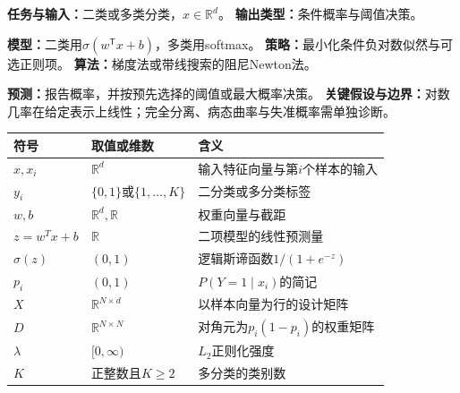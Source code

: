 \begin{keypointbox}[title=模型认识卡：逻辑斯谛回归]
\textbf{任务与输入：}二类或多类分类，$x\in\mathbb R^d$。\quad
\textbf{输出类型：}条件概率与阈值决策。\par
\textbf{模型：}二类用$\sigma(w^{\mathsf T}x+b)$，多类用softmax。\quad
\textbf{策略：}最小化条件负对数似然与可选正则项。\quad
\textbf{算法：}梯度法或带线搜索的阻尼Newton法。\par
\textbf{预测：}报告概率，并按预先选择的阈值或最大概率决策。\quad
\textbf{关键假设与边界：}对数几率在给定表示上线性；完全分离、病态曲率与失准概率需单独诊断。
\end{keypointbox}

\label{struct:V2-C05-CH05}
\begin{symboltablebox}
\begin{tabularx}{\linewidth}{@{}l l X@{}}
\toprule 符号 & 取值或维数 & 含义\\ \midrule
$x,x_i$ & $\mathbb R^d$ & 输入特征向量与第$i$个样本的输入\\
$y_i$ & $\{0,1\}$或$\{1,\ldots,K\}$ & 二分类或多分类标签\\
$w,b$ & $\mathbb R^d,\mathbb R$ & 权重向量与截距\\
$z=w^Tx+b$ & $\mathbb R$ & 二项模型的线性预测量\\
$\sigma(z)$ & $(0,1)$ & 逻辑斯谛函数$1/(1+e^{-z})$\\
$p_i$ & $(0,1)$ & $P(Y=1\mid x_i)$的简记\\
$X$ & $\mathbb R^{N\times d}$ & 以样本向量为行的设计矩阵\\
$D$ & $\mathbb R^{N\times N}$ & 对角元为$p_i(1-p_i)$的权重矩阵\\
$\lambda$ & $[0,\infty)$ & $L_2$正则化强度\\
$K$ & 正整数且$K\geq2$ & 多分类的类别数\\
\bottomrule
\end{tabularx}
\end{symboltablebox}

